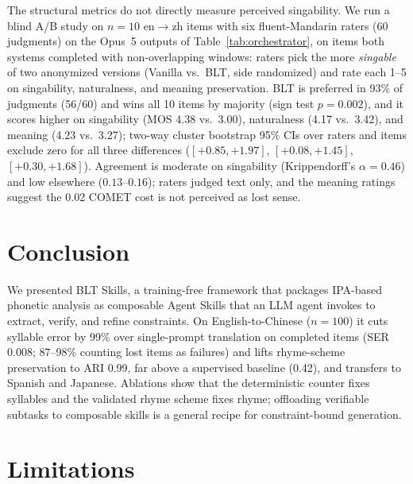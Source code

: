 \documentclass[11pt]{article}
\begin{document}
The structural metrics do not directly measure perceived singability.
We run a blind A/B study on $n{=}10$ en$\rightarrow$zh items with six fluent-Mandarin raters (60 judgments) on the Opus~5 outputs of Table~\ref{tab:orchestrator}, on items both systems completed with non-overlapping windows: raters pick the more \emph{singable} of two anonymized versions (Vanilla vs.\ BLT, side randomized) and rate each 1--5 on singability, naturalness, and meaning preservation.
BLT is preferred in 93\% of judgments (56/60) and wins all 10 items by majority (sign test $p{=}0.002$), and it scores higher on singability (MOS 4.38 vs.\ 3.00), naturalness (4.17 vs.\ 3.42), and meaning (4.23 vs.\ 3.27); two-way cluster bootstrap 95\% CIs over raters and items exclude zero for all three differences ($[+0.85, +1.97]$, $[+0.08, +1.45]$, $[+0.30, +1.68]$).
Agreement is moderate on singability (Krippendorff's $\alpha{=}0.46$) and low elsewhere ($0.13$--$0.16$); raters judged text only, and the meaning ratings suggest the 0.02 COMET cost is not perceived as lost sense.

\section{Conclusion}

We presented BLT Skills, a training-free framework that packages IPA-based phonetic analysis as composable Agent Skills that an LLM agent invokes to extract, verify, and refine constraints.
On English-to-Chinese ($n{=}100$) it cuts syllable error by 99\% over single-prompt translation on completed items (SER 0.008; 87--98\% counting lost items as failures) and lifts rhyme-scheme preservation to ARI 0.99, far above a supervised baseline (0.42), and transfers to Spanish and Japanese.
Ablations show that the deterministic counter fixes syllables and the validated rhyme scheme fixes rhyme; offloading verifiable subtasks to composable skills is a general recipe for constraint-bound generation.

\section*{Limitations}
\end{document}
